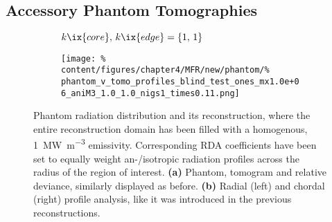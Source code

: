         \subsection{Accessory Phantom Tomographies}\label{apx:accessory}%
%
            \begin{figure}%
                \centering%
                \begin{subfigure}{\textwidth}%
                    \centering%
                    \caption{$k\ix{core},\,k\ix{edge}=\left\{1,\,1\right\}$}%
                \end{subfigure}%
                \newline%
                \begin{subfigure}{\textwidth}%
                    \centering%
                    \texttt{[image: \%
                        content/figures/chapter4/MFR/new/phantom/\%
                        phantom\_v\_tomo\_profiles\_blind\_test\_ones\_mx1.0e+06\_aniM3\_1.0\_1.0\_nigs1\_times0.11.png]}%
                    \caption{}%
                \end{subfigure}%
                \caption{Phantom radiation distribution and its reconstruction, where the entire reconstruction domain has been filled with a homogenous, \SI{1}{\mega\watt\per\cubic\meter} emissivity. Corresponding RDA coefficients have been set to equally weight an-/isotropic radiation profiles across the radius of the region of interest. \textbf{(a)} Phantom, tomogram and relative deviance, similarly displayed as before. \textbf{(b)} Radial (left) and chordal (right) profile analysis, like it was introduced in the previous reconstructions.}\label{fig:phantom_blind_test}%
            \end{figure}%
%
